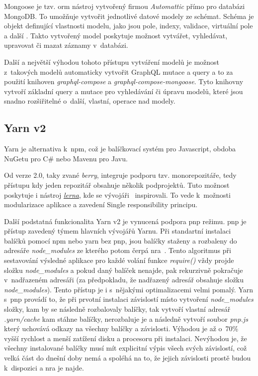 Mongoose je tzv. \acrfull{orm} nástroj vytvořený firmou \emph{Automattic} přímo pro databázi MongoDB. To umožňuje vytvořit jednotlivé datové modely ze schémat. Schéma je objekt definující vlastnosti modelu, jako jsou pole, indexy, validace, virtuální pole a další \cite{automatticinc_2020_mongoose}. Takto vytvořený model poskytuje možnost vytvářet, vyhledávat, upravovat či mazat záznamy v~databázi.

Další a největší výhodou tohoto přístupu vytváření modelů je možnost z~takových modelů automaticky vytvořit GraphQL mutace a query a to za použití knihoven \emph{graphql-compose} a \emph{graphql-compose-mongoose}. Tyto knihovny vytvoří základní query a mutace pro vyhledávání či úpravu modelů, které jsou snadno rozšiřitelné o~další, vlastní, operace nad modely.

\subsection{Yarn v2}
\label{ss:yarn}
Yarn je alternativa k~\acrshort{npm}, což je balíčkovací systém pro Javascript, obdoba NuGetu pro C\# nebo Mavenu pro Javu.

Od verze 2.0, taky zvané \emph{berry}, integruje podporu tzv. monorepozitáře, tedy přístupu kdy jeden repozitář obsahuje několik podprojektů. Tuto možnost poskytuje i nástroj \href{https://github.com/lerna/lerna}{\emph{lerna}}, kde se vývojáři~ inspirovali. To vede k~možnosti modularizace aplikace a zavedení Single responsibility principu.

Další podstatná funkcionalita Yarn v2 je vynucená podpora \acrfull{pnp} režimu. \acrshort{pnp} je přístup zavedený týmem hlavních vývojářů Yarnu. Při standartní instalaci balíčků pomocí npm nebo yarn bez pnp, jsou balíčky staženy a rozbaleny do adresáře \emph{node\_modules} ze kterého potom čerpá \acrfull{nra}~\cite{joyentinc_1_noderesolutionalgorithm}. Tento algoritmus při sestavování výsledné aplikace pro každé volání funkce \emph{require()} vždy projde složku \emph{node\_modules} a pokud daný balíček nenajde, pak rekurzivně pokračuje v~nadřazeném adresáři (za předpokladu, že nadřazený adresář obsahuje složku \emph{node\_modules}). Tento přístup je i s~nějakými optimalizacemi velmi pomalý. Yarn s~\acrshort{pnp} provádí to, že při prvotní instalaci závislostí místo vytvoření \emph{node\_modules} složky, kam by se následně rozbalovaly balíčky, tak vytvoří vlastní adresář \emph{.yarn/cache} kam stáhne balíčky, nerozbaluje je a následně vytvoří soubor \emph{pnp.js} který uchovává odkazy na všechny balíčky a závislosti. Výhodou je až o~70\% vyšší rychlost a menší zatížení disku a procesoru při instalaci. Nevýhodou je, že všechny instalované balíčky musí mít explicitní výpis všech svých závislostí, což velká část do dnešní doby nemá a spoléhá na to, že jejich závislosti prostě budou k~dispozici a \acrshort{nra} je najde.

